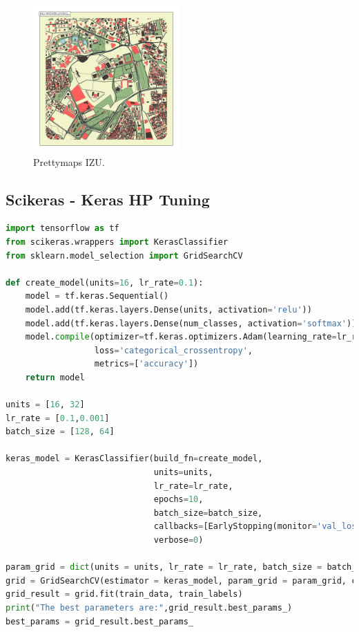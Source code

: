 \begin{figure}[ht]
    \centering
    \includegraphics[width=0.5\textwidth]{images/izu.png}
    \caption{Prettymaps IZU.}
    \label{fig:enter-label}
\end{figure}

\newpage

\subsection{Scikeras - Keras HP Tuning}
\begin{lstlisting}[language=Python]
import tensorflow as tf
from scikeras.wrappers import KerasClassifier
from sklearn.model_selection import GridSearchCV

def create_model(units=16, lr_rate=0.1):
    model = tf.keras.Sequential()
    model.add(tf.keras.layers.Dense(units, activation='relu'))
    model.add(tf.keras.layers.Dense(num_classes, activation='softmax'))
    model.compile(optimizer=tf.keras.optimizers.Adam(learning_rate=lr_rate),
                  loss='categorical_crossentropy',
                  metrics=['accuracy'])
    return model

units = [16, 32]
lr_rate = [0.1,0.001]
batch_size = [128, 64]

keras_model = KerasClassifier(build_fn=create_model, 
                              units=units, 
                              lr_rate=lr_rate, 
                              epochs=10, 
                              batch_size=batch_size, 
                              callbacks=[EarlyStopping(monitor='val_loss', patience=3)], 
                              verbose=0)

param_grid = dict(units = units, lr_rate = lr_rate, batch_size = batch_size)
grid = GridSearchCV(estimator = keras_model, param_grid = param_grid, cv = 3)
grid_result = grid.fit(train_data, train_labels)
print("The best parameters are:",grid_result.best_params_)
best_params = grid_result.best_params_
\end{lstlisting}


